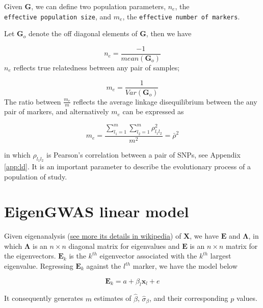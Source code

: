 \documentclass[]{book}
\begin{document}
Given \(\mathbf{G}\), we can define two population parameters, \(n_e\),
the \texttt{effective\ population\ size}, and \(m_e\), the
\texttt{effective\ number\ of\ markers}.

Let \(\mathbf{G}_o\) denote the off diagonal elements of \(\mathbf{G}\),
then we have

\begin{equation}
n_e=\frac{-1}{mean(\mathbf{G}_o)} \label{eq:Ne}
\end{equation} \(n_e\) reflects true relatedness between any pair of
samples;

\begin{equation}
m_e=\frac{1}{Var(\mathbf{G}_o)}  \label{eq:Me1}
\end{equation} The ratio between \(\frac{m_e}{m}\) reflects the average
linkage disequilibrium between the any pair of markers, and
alternatively \(m_e\) can be expressed as

\begin{equation}
m_e=\frac{\sum_{l_1=1}^m\sum_{l_2=1}^m\rho_{l_1l_2}^2}{m^2}=\bar{\rho}^2 \label{eq:Me2}
\end{equation}

in which \(\rho_{l_1l_2}\) is Pearson's correlation between a pair of
SNPs, see Appendix \ref{app:ld}. It is an important parameter to
describe the evolutionary process of a population of study.

\hypertarget{eigengwas-linear-model}{%
\section{EigenGWAS linear model}\label{eigengwas-linear-model}}

Given eigenanalysis
(\href{https://en.wikipedia.org/wiki/Eigenvalues_and_eigenvectors}{see
more its details in wikipedia}) of \(\mathbf{X}\), we have
\(\mathbf{E}\) and \(\mathbf{\Lambda}\), in which \(\mathbf{\Lambda}\)
is an \(n \times n\) diagonal matrix for eigenvalues and \(\mathbf{E}\)
is an \(n \times n\) matrix for the eigenvectors. \(\mathbf{E}_k\) is
the \(k^{th}\) eigenvector associated with the \(k^{th}\) largest
eigenvalue. Regressing \(\mathbf{E}_k\) against the \(l^{th}\) marker,
we have the model below

\begin{equation}
\mathbf{E}_k=a+\beta_l\mathbf{x}_l+e \label{eq:EG-mod}
\end{equation}

It consequently generates \(m\) estimates of \(\hat{\beta}\),
\(\hat{\sigma}_{\beta}\), and their corresponding \(p\) values.
\end{document}

